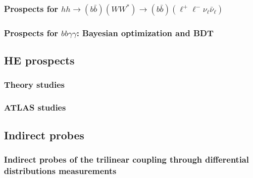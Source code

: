\documentclass[../report.tex]{subfiles}
\providecommand{\main}{..}
\begin{document}
\subsubsection{Prospects for $hh \to (b \bar b)(WW^*) \to (b \bar b)( \ell^+\ell^- \nu_\ell \bar\nu_\ell)$}





\subsubsection{Prospects for $bb\gamma\gamma $: Bayesian optimization and BDT}












\subsection{HE prospects}

\subsubsection{Theory studies}


\subsubsection{ATLAS studies}




\subsection{Indirect probes}

\subsubsection{Indirect probes of the trilinear coupling through differential distributions measurements}
\end{document}
